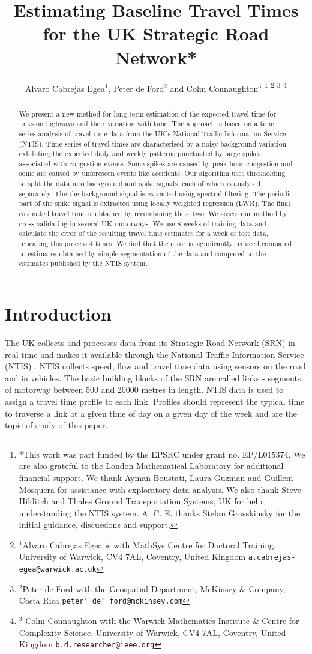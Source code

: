 \documentclass[letterpaper, 10 pt, conference]{ieeeconf}  %
\title{\LARGE \bf
Estimating Baseline Travel Times for the UK Strategic Road Network*
}
\author{Alvaro Cabrejas Egea$^{1}$, Peter de Ford$^{2}$ and Colm Connaughton$^{3}$%
\thanks{*This work was part funded by the EPSRC under grant no. EP/L015374. 
We are also grateful to the London Mathematical Laboratory for additional financial support. 
We thank Ayman Boustati, Laura Guzman and Guillem Mosquera for assistance with exploratory data analysis. 
We also thank Steve Hilditch and Thales Ground Transportation Systems, UK for help understanding the NTIS system.  
A. C. E. thanks Stefan Grosskinsky for the initial guidance, discussions and support.}%
\thanks{$^{1}$Alvaro Cabrejas Egea is with MathSys Centre for Doctoral Training,
        University of Warwick, CV4 7AL, Coventry, United Kingdom
        {\tt\small a.cabrejas-egea@warwick.ac.uk}}%
\thanks{$^{2}$Peter de Ford with the Geospatial Department, McKinsey \& Company,
        Costa Rica
        {\tt\small peter\char`_de\char`_ford@mckinsey.com}}%
\thanks{$^{3}$ Colm Connaughton with the Warwick Mathematics Institute \& Centre for Complexity Science, University of Warwick,
        CV4 7AL, Coventry, United Kingdom
        {\tt\small b.d.researcher@ieee.org}}%
}
\begin{document}
\maketitle
\thispagestyle{empty}
\pagestyle{empty}


\begin{abstract}
We present a new method for long-term estimation of the expected travel time for links on highways and their variation with time.  
The approach is based on a time series analysis of travel time data from the UK's National Traffic Information Service (NTIS).  
Time series of travel times are characterised by a noisy background variation exhibiting the expected daily and weekly patterns punctuated by large spikes associated with congestion events. 
Some spikes are caused by peak hour congestion and some are caused by unforeseen events like accidents. 
Our algorithm uses thresholding to split the data into background and spike signals, each of which is analysed separately. 
The the background signal is extracted using spectral filtering. 
The periodic part of the spike signal is extracted using locally weighted regression (LWR). 
The final estimated travel time is obtained by recombining these two. 
We assess our method by cross-validating in several UK motorways. 
We use 8 weeks of training data and calculate the error of the resulting travel time estimates for a week of test data, repeating this process 4 times. 
We find that the error is significantly reduced compared to estimates obtained by simple segmentation of the data and compared to the estimates published by the NTIS system.
\end{abstract}

\section{Introduction}
The UK collects and processes data from its Strategic Road Network (SRN) in real time and makes it available through the National Traffic Information Service (NTIS) \cite{NTIS}. 
NTIS collects speed, flow and travel time data using sensors on the road and in vehicles. 
The basic building blocks of the SRN are called links -  segments of motorway between 500 and 20000 metres in length.  
NTIS data is used to assign a travel time profile to each link. 
Profiles should represent the typical time to traverse a link at a given time of day on a given day of the week and are the topic of study of this paper.
 
\end{document}
